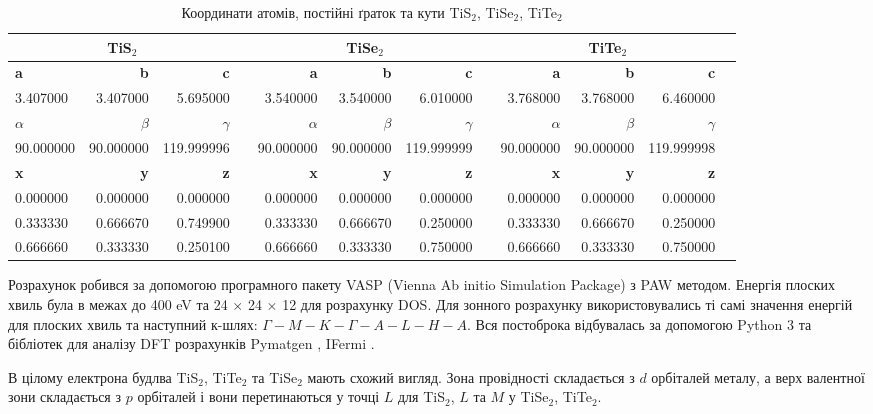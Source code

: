 \begin{table}[!htp]\centering

\scriptsize
\begin{tabular}{lrrrrrrrrrrr}\toprule
\multicolumn{3}{c}{\textbf{TiS$_2$}} & &\multicolumn{3}{c}{\textbf{TiSe$_2$}} & &\multicolumn{3}{c}{\textbf{TiTe$_2$}} \\\midrule
\textbf{a} &\textbf{b} &\textbf{c} & &\textbf{a} &\textbf{b} &\textbf{c} & &\textbf{a} &\textbf{b} &\textbf{c} \\
3.407000 &3.407000 &5.695000 & &3.540000 &3.540000 &6.010000 & &3.768000 &3.768000 &6.460000 \\
\textbf{$\alpha$} &\textbf{$\beta$} &\textbf{$\gamma$} & &\textbf{$\alpha$} &\textbf{$\beta$} &\textbf{$\gamma$} & &\textbf{$\alpha$} &\textbf{$\beta$} &\textbf{$\gamma$} \\
90.000000 &90.000000 &119.999996 & &90.000000 &90.000000 &119.999999 & &90.000000 &90.000000 &119.999998 \\
\textbf{x} &\textbf{y} &\textbf{z} & &\textbf{x} &\textbf{y} &\textbf{z} & &\textbf{x} &\textbf{y} &\textbf{z} \\
0.000000 &0.000000 &0.000000 & &0.000000 &0.000000 &0.000000 & &0.000000 &0.000000 &0.000000 \\
0.333330 &0.666670 &0.749900 & &0.333330 &0.666670 &0.250000 & &0.333330 &0.666670 &0.250000 \\
0.666660 &0.333330 &0.250100 & &0.666660 &0.333330 &0.750000 & &0.666660 &0.333330 &0.750000 \\
\bottomrule
\end{tabular}
\caption{Координати атомів, постійні ґраток та кути TiS$_2$, TiSe$_2$, TiTe$_2$}\label{tab:Structure}
\end{table}

Розрахунок робився за допомогою програмного пакету VASP (Vienna Ab initio Simulation Package) \cite{VASP1,VASP2, VASP3, VASP4} з PAW методом. Енергія плоских хвиль була в межах до 400 eV та 24 $\times$ 24 $\times$ 12 для розрахунку DOS. Для зонного розрахунку використовувались ті самі значення енергій для плоских хвиль та наступний к-шлях: $\Gamma-M-K-\Gamma-A-L-H-A$.
Вся постоброка відбувалась за допомогою Python 3 \cite{Python} та бібліотек для аналізу DFT розрахунків Pymatgen \cite{PyMatgen}, IFermi \cite{Ifermi}. 

В цілому електрона будлва TiS$_2$, TiTe$_2$ та TiSe$_2$ мають схожий вигляд. Зона провідності складається з $d$ орбіталей металу, а верх валентної зони складається з $p$ орбіталей і вони перетинаються у точці $L$ для TiS$_2$, $L$ та $M$ у TiSe$_2$, TiTe$_2$. 

